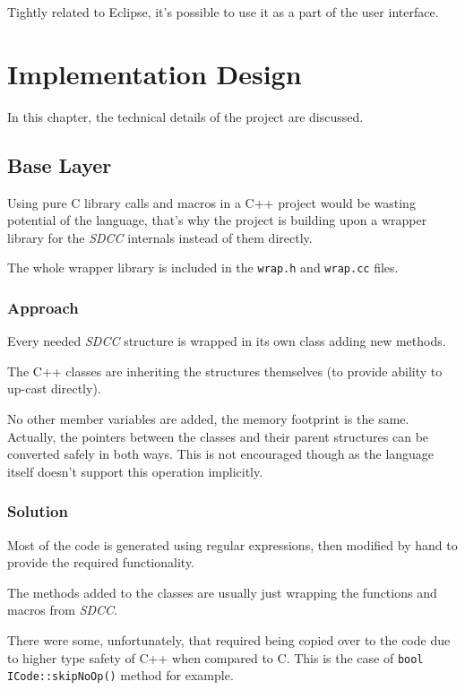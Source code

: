         Tightly related to Eclipse, it's possible to use it as a part of the user interface.

        


\chapter{Implementation Design}\label{design}

In this chapter, the technical details of the project are discussed.

    \section{Base Layer}

    Using pure C library calls and macros in a C++ project would be wasting potential of the language, that's why the project is building upon a wrapper library for the \emph{SDCC} internals instead of them directly.

    The whole wrapper library is included in the \texttt{wrap.h} and \texttt{wrap.cc} files.

        \subsection{Approach}

        Every needed \emph{SDCC} structure is wrapped in its own class adding new methods.

        The C++ classes are inheriting the structures themselves (to provide ability to up-cast directly).

        No other member variables are added, the memory footprint is the same. Actually, the pointers between the classes and their parent structures can be converted safely in both ways. This is not encouraged though as the language itself doesn't support this operation implicitly.

        \subsection{Solution}

        Most of the code is generated using regular expressions, then modified by hand to provide the required functionality.

        The methods added to the classes are usually just wrapping the functions and macros from \emph{SDCC}.

        There were some, unfortunately, that required being copied over to the code due to higher type safety of C++ when compared to C. This is the case of \texttt{bool ICode::skipNoOp()} method for example.

